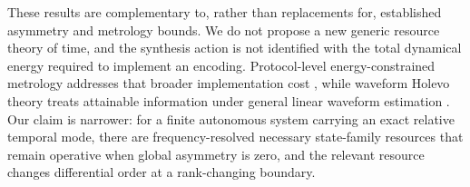 These results are complementary to, rather than replacements for, established asymmetry and metrology bounds. We do not propose a new generic resource theory of time, and the synthesis action is not identified with the total dynamical energy required to implement an encoding. Protocol-level energy-constrained metrology addresses that broader implementation cost \cite{ChenYang2026}, while waveform Holevo theory treats attainable information under general linear waveform estimation \cite{GardnerEtAl2024}. Our claim is narrower: for a finite autonomous system carrying an exact relative temporal mode, there are frequency-resolved necessary state-family resources that remain operative when global asymmetry is zero, and the relevant resource changes differential order at a rank-changing boundary.